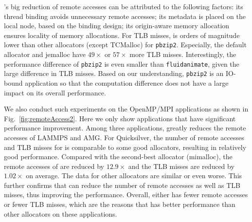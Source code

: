 \NM{}'s big reduction of remote accesses can be attributed to the following factors: its thread binding avoids unnecessary remote accesses; its metadata is placed on the local node, based on the binding design; its origin-aware memory allocation ensures locality of memory allocations.
For TLB misses, \NM{} is orders of magnitude lower than other allocators (except TCMalloc) for \texttt{pbzip2}. Especially, the default allocator and jemalloc have $49\times$ or $57\times$ more TLB misses. Interestingly, the performance difference of \texttt{pbzip2} is even smaller than \texttt{fluidanimate}, given the large difference in TLB misses. Based on our understanding, \texttt{pbzip2} is an IO-bound application so that the computation difference does not have a large impact on its overall performance. 



We also conduct such experiments on the OpenMP/MPI applications as shown in Fig.~\ref{fig:remoteAccess2}. Here we only show applications that have significant performance improvement. Among three applications, \NM{} greatly reduces the remote accesses of LAMMPS and AMG. For Quicksilver, the number of remote accesses and TLB misses for \NM{} is comparable to some good allocators, resulting in relatively good performance. Compared with the second-best allocator (mimalloc), the remote accesses of \NM{} are
reduced by $12.9\times$ and the TLB misses are reduced by $1.02\times$ on average. The data for other allocators are similar
or even worse. This further confirms that \NM{} can reduce the number of remote accesses as well as TLB misses, thus improving the performance.
Overall, \NM{} either has fewer remote accesses or fewer TLB misses, which are the reasons that \NM{} has better performance than other allocators on these applications. 





